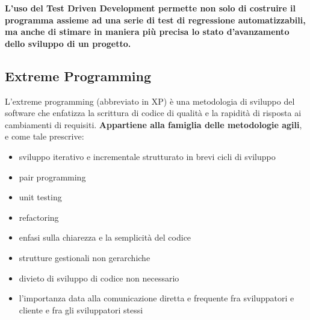 \documentclass[11pt,a4paper]{book}
\begin{document}
\textbf{L'uso del Test Driven Development permette non solo di costruire il programma assieme ad una serie di test di regressione automatizzabili, ma anche di stimare in maniera più precisa lo stato d'avanzamento dello sviluppo di un progetto.}

\subsection{Extreme Programming}
L'extreme programming (abbreviato in XP) è una metodologia di sviluppo del software che enfatizza la scrittura di codice di qualità e la rapidità di risposta ai cambiamenti di requisiti. \textbf{Appartiene alla famiglia delle metodologie agili}, e come tale prescrive:
\begin{itemize}
	\item  sviluppo iterativo e incrementale strutturato in brevi cicli di sviluppo
	\item pair programming
	\item unit testing
	\item refactoring
	\item enfasi sulla chiarezza e la semplicità del codice
	\item strutture gestionali non gerarchiche
	\item divieto di sviluppo di codice non necessario
	\item l'importanza data alla comunicazione diretta e frequente fra sviluppatori e cliente e fra gli sviluppatori stessi
\end{itemize}
\end{document}
